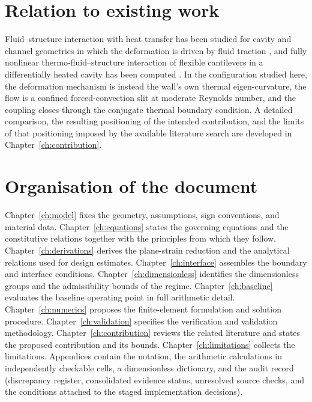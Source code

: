 \section{Relation to existing work}
Fluid--structure interaction with heat transfer has been studied for cavity and channel geometries
in which the deformation is driven by fluid traction \cite{soti2015steady,alsabery2019numerical,%
saleh2025laminar}, and fully nonlinear thermo-fluid--structure interaction of flexible cantilevers
in a differentially heated cavity has been computed \cite{kumar2026thermo}.
In the configuration studied here, the deformation mechanism is instead the wall's own thermal
eigen-curvature, the flow is a confined forced-convection slit at moderate Reynolds number, and the
coupling closes through the conjugate thermal boundary condition. A detailed comparison, the
resulting positioning of the intended contribution, and the limits of that positioning imposed by
the available literature search are developed in Chapter~\ref{ch:contribution}.

\section{Organisation of the document}
Chapter~\ref{ch:model} fixes the geometry, assumptions, sign conventions, and material data.
Chapter~\ref{ch:equations} states the governing equations and the constitutive relations together
with the principles from which they follow. Chapter~\ref{ch:derivations} derives the plane-strain
reduction and the analytical relations used for design estimates. Chapter~\ref{ch:interface}
assembles the boundary and interface conditions. Chapter~\ref{ch:dimensionless} identifies the
dimensionless groups and the admissibility bounds of the regime. Chapter~\ref{ch:baseline}
evaluates the baseline operating point in full arithmetic detail. Chapter~\ref{ch:numerics}
proposes the finite-element formulation and solution procedure. Chapter~\ref{ch:validation}
specifies the verification and validation methodology. Chapter~\ref{ch:contribution} reviews the
related literature and states the proposed contribution and its bounds.
Chapter~\ref{ch:limitations} collects the limitations. Appendices contain the notation, the
arithmetic calculations in independently checkable cells, a dimensionless dictionary, and the audit
record (discrepancy register, consolidated evidence status, unresolved source checks, and the
conditions attached to the staged implementation decisions).
